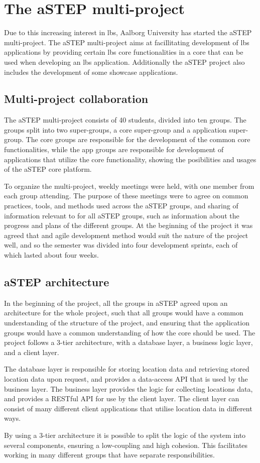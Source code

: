 \section{The aSTEP multi-project} \label{sec:astep}
Due to this increasing interest in \gls{lbs}, Aalborg University has started the aSTEP multi-project. The aSTEP multi-project aims at facillitating development of \gls{lbs} applications by providing certain \gls{lbs} core functionalities in a core that can be used when developing an \gls{lbs} application. Additionally the aSTEP project also includes the development of some showcase applications.

\subsection{Multi-project collaboration}
The aSTEP multi-project consists of 40 students, divided into ten groups. The groups split into two super-groups, a core super-group and a application super-group. The core groups are responsible for the development of the common core functionalities, while the app groups are responsible for development of applications that utilize the core functionality, showing the posibilities and usages of the aSTEP core platform. 

To organize the multi-project, weekly meetings were held, with one member from each group attending. The purpose of these meetings were to agree on common practices, tools, and methods used across the aSTEP groups, and sharing of information relevant to for all aSTEP groups, such as information about the progress and plans of the different groups. At the beginning of the project it was agreed that and agile development method would suit the nature of the project well, and so the semester was divided into four development sprints, each of which lasted about four weeks.

\subsection{aSTEP architecture}
In the beginning of the project, all the groups in aSTEP agreed upon an architecture for the whole project, such that all groups would have a common understanding of the structure of the project, and ensuring that the application groups would have a common understanding of how the core should be used. The project follows a 3-tier architecture, with a database layer, a business logic layer, and a client layer. 

The database layer is responsible for storing location data and retrieving stored location data upon request, and provides a data-access API that is used by the business layer. The business layer provides the logic for collecting locations data, and provides a RESTful API for use by the client layer. The client layer can consist of many different client applications that utilise location data in different ways.

By using a 3-tier architecture it is possible to split the logic of the system into several components, ensuring a low-coupling and high cohesion. This facilitates working in many different groups that have separate responsibilities.